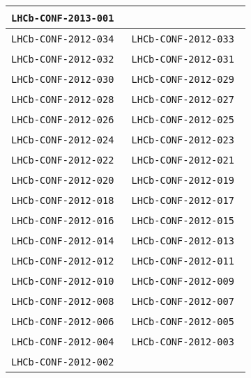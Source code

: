\begin{center}
\begin{longtable}{ll}
\texttt{LHCb-CONF-2013-001}~\cite{LHCb-CONF-2013-001} \\
\hline
\texttt{LHCb-CONF-2012-034}~\cite{LHCb-CONF-2012-034} & 
\texttt{LHCb-CONF-2012-033}~\cite{LHCb-CONF-2012-033} \\
\texttt{LHCb-CONF-2012-032}~\cite{LHCb-CONF-2012-032} & 
\texttt{LHCb-CONF-2012-031}~\cite{LHCb-CONF-2012-031} \\
\texttt{LHCb-CONF-2012-030}~\cite{LHCb-CONF-2012-030} & 
\texttt{LHCb-CONF-2012-029}~\cite{LHCb-CONF-2012-029} \\
\texttt{LHCb-CONF-2012-028}~\cite{LHCb-CONF-2012-028} & 
\texttt{LHCb-CONF-2012-027}~\cite{LHCb-CONF-2012-027} \\
\texttt{LHCb-CONF-2012-026}~\cite{LHCb-CONF-2012-026} & 
\texttt{LHCb-CONF-2012-025}~\cite{LHCb-CONF-2012-025} \\
\texttt{LHCb-CONF-2012-024}~\cite{LHCb-CONF-2012-024} & 
\texttt{LHCb-CONF-2012-023}~\cite{LHCb-CONF-2012-023} \\
\texttt{LHCb-CONF-2012-022}~\cite{LHCb-CONF-2012-022} & 
\texttt{LHCb-CONF-2012-021}~\cite{LHCb-CONF-2012-021} \\
\texttt{LHCb-CONF-2012-020}~\cite{LHCb-CONF-2012-020} & 
\texttt{LHCb-CONF-2012-019}~\cite{LHCb-CONF-2012-019} \\
\texttt{LHCb-CONF-2012-018}~\cite{LHCb-CONF-2012-018} & 
\texttt{LHCb-CONF-2012-017}~\cite{LHCb-CONF-2012-017} \\
\texttt{LHCb-CONF-2012-016}~\cite{LHCb-CONF-2012-016} & 
\texttt{LHCb-CONF-2012-015}~\cite{LHCb-CONF-2012-015} \\
\texttt{LHCb-CONF-2012-014}~\cite{LHCb-CONF-2012-014} & 
\texttt{LHCb-CONF-2012-013}~\cite{LHCb-CONF-2012-013} \\
\texttt{LHCb-CONF-2012-012}~\cite{LHCb-CONF-2012-012} & 
\texttt{LHCb-CONF-2012-011}~\cite{LHCb-CONF-2012-011} \\
\texttt{LHCb-CONF-2012-010}~\cite{LHCb-CONF-2012-010} & 
\texttt{LHCb-CONF-2012-009}~\cite{LHCb-CONF-2012-009} \\
\texttt{LHCb-CONF-2012-008}~\cite{LHCb-CONF-2012-008} & 
\texttt{LHCb-CONF-2012-007}~\cite{LHCb-CONF-2012-007} \\
\texttt{LHCb-CONF-2012-006}~\cite{LHCb-CONF-2012-006} & 
\texttt{LHCb-CONF-2012-005}~\cite{LHCb-CONF-2012-005} \\
\texttt{LHCb-CONF-2012-004}~\cite{LHCb-CONF-2012-004} & 
\texttt{LHCb-CONF-2012-003}~\cite{LHCb-CONF-2012-003} \\
\texttt{LHCb-CONF-2012-002}~\cite{LHCb-CONF-2012-002} & 

\end{longtable}
\end{center}
